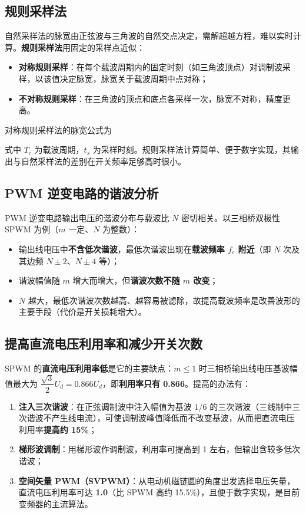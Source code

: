 \subsection{规则采样法}

自然采样法的脉宽由正弦波与三角波的自然交点决定，需解超越方程，难以实时计算。\textbf{规则采样法}用固定的采样点近似：

\begin{itemize}
  \item \textbf{对称规则采样}：在每个载波周期内的固定时刻（如三角波顶点）对调制波采样，以该值决定脉宽，脉宽关于载波周期中点对称；
  \item \textbf{不对称规则采样}：在三角波的顶点和底点各采样一次，脉宽不对称，精度更高。
\end{itemize}

对称规则采样法的脉宽公式为


式中 $T_c$ 为载波周期，$t_s$ 为采样时刻。规则采样法计算简单、便于数字实现，其输出与自然采样法的差别在开关频率足够高时很小。

\subsection{PWM 逆变电路的谐波分析}

PWM 逆变电路输出电压的谐波分布与载波比 $N$ 密切相关。以三相桥双极性 SPWM 为例（$m$ 一定、$N$ 为整数）：

\begin{itemize}
  \item 输出线电压中\textbf{不含低次谐波}，最低次谐波出现在\textbf{载波频率 $f_c$ 附近}（即 $N$ 次及其边频 $N\pm2$、$N\pm4$ 等）；
  \item 谐波幅值随 $m$ 增大而增大，但\textbf{谐波次数不随 $m$ 改变}；
  \item $N$ 越大，最低次谐波次数越高、越容易被滤除，故提高载波频率是改善波形的主要手段（代价是开关损耗增大）。
\end{itemize}

\subsection{提高直流电压利用率和减少开关次数}

SPWM 的\textbf{直流电压利用率低}是它的主要缺点：$m\le1$ 时三相桥输出线电压基波幅值最大为 $\dfrac{\sqrt{3}}{2}U_d=0.866U_d$，即\textbf{利用率只有 0.866}。提高的办法有：

\begin{enumerate}
  \item \textbf{注入三次谐波}：在正弦调制波中注入幅值为基波 $1/6$ 的三次谐波（三线制中三次谐波不产生线电流），可使调制波峰值降低而不改变基波，从而把直流电压利用率\textbf{提高约 15\%}；
  \item \textbf{梯形波调制}：用梯形波作调制波，利用率可提高到 1 左右，但输出含较多低次谐波；
  \item \textbf{空间矢量 PWM（SVPWM）}：从电动机磁链圆的角度出发选择电压矢量，直流电压利用率可达 \textbf{1.0}（比 SPWM 高约 15.5\%），且便于数字实现，是目前变频器的主流算法。
\end{enumerate}


